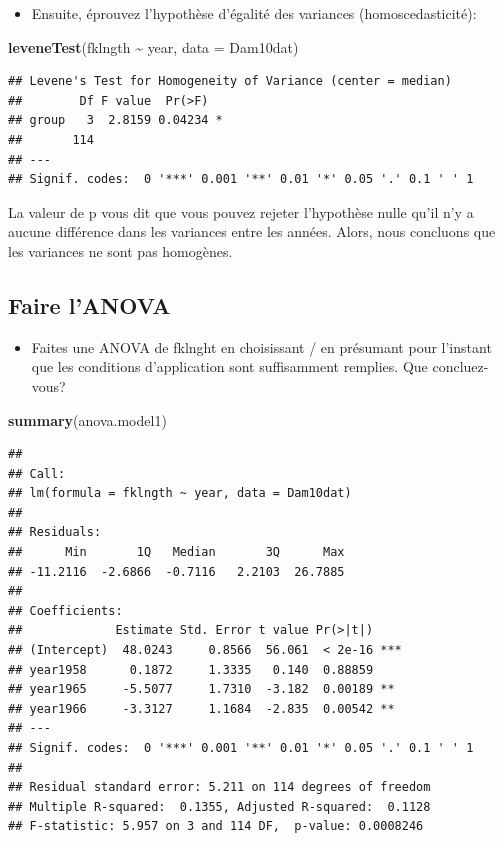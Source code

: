 \documentclass[
  12pt,
]{book}
\newenvironment{Shaded}{\begin{snugshade}}{\end{snugshade}}
\newcommand{\DataTypeTok}[1]{\textcolor[rgb]{0.13,0.29,0.53}{#1}}
\newcommand{\KeywordTok}[1]{\textcolor[rgb]{0.13,0.29,0.53}{\textbf{#1}}}
\newcommand{\NormalTok}[1]{#1}
\newcommand{\OperatorTok}[1]{\textcolor[rgb]{0.81,0.36,0.00}{\textbf{#1}}}
\newcommand{\StringTok}[1]{\textcolor[rgb]{0.31,0.60,0.02}{#1}}
\providecommand{\tightlist}{%
  \setlength{\itemsep}{0pt}\setlength{\parskip}{0pt}}
\begin{document}
\begin{itemize}
\tightlist
\item
  Ensuite, éprouvez l'hypothèse d'égalité des variances (homoscedasticité):
\end{itemize}

\begin{Shaded}
\begin{Highlighting}[]
\KeywordTok{leveneTest}\NormalTok{(fklngth }\OperatorTok{\textasciitilde{}}\StringTok{ }\NormalTok{year, }\DataTypeTok{data =}\NormalTok{ Dam10dat)}
\end{Highlighting}
\end{Shaded}

\begin{verbatim}
## Levene's Test for Homogeneity of Variance (center = median)
##        Df F value  Pr(>F)  
## group   3  2.8159 0.04234 *
##       114                  
## ---
## Signif. codes:  0 '***' 0.001 '**' 0.01 '*' 0.05 '.' 0.1 ' ' 1
\end{verbatim}

La valeur de p vous dit que vous pouvez rejeter l'hypothèse nulle qu'il n'y a aucune différence dans les variances entre les années. Alors, nous concluons que les variances ne sont pas homogènes.

\hypertarget{faire-lanova}{%
\subsection{Faire l'ANOVA}\label{faire-lanova}}

\begin{itemize}
\tightlist
\item
  Faites une ANOVA de fklnght en choisissant / en présumant pour l'instant que les conditions d'application sont suffisamment remplies. Que concluez-vous?
\end{itemize}

\begin{Shaded}
\begin{Highlighting}[]
\KeywordTok{summary}\NormalTok{(anova.model1)}
\end{Highlighting}
\end{Shaded}

\begin{verbatim}
## 
## Call:
## lm(formula = fklngth ~ year, data = Dam10dat)
## 
## Residuals:
##      Min       1Q   Median       3Q      Max 
## -11.2116  -2.6866  -0.7116   2.2103  26.7885 
## 
## Coefficients:
##             Estimate Std. Error t value Pr(>|t|)    
## (Intercept)  48.0243     0.8566  56.061  < 2e-16 ***
## year1958      0.1872     1.3335   0.140  0.88859    
## year1965     -5.5077     1.7310  -3.182  0.00189 ** 
## year1966     -3.3127     1.1684  -2.835  0.00542 ** 
## ---
## Signif. codes:  0 '***' 0.001 '**' 0.01 '*' 0.05 '.' 0.1 ' ' 1
## 
## Residual standard error: 5.211 on 114 degrees of freedom
## Multiple R-squared:  0.1355, Adjusted R-squared:  0.1128 
## F-statistic: 5.957 on 3 and 114 DF,  p-value: 0.0008246
\end{verbatim}
\end{document}
